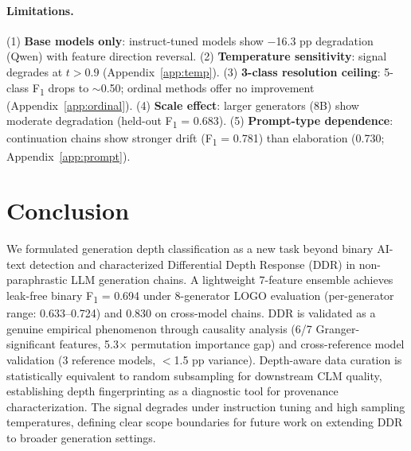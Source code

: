 \documentclass[11pt,a4paper]{article}
\newcommand{\fone}{F\textsubscript{1}}
\begin{document}
\paragraph{Limitations.}
(1) \textbf{Base models only}: instruct-tuned models show $-$16.3 pp degradation (Qwen) with feature direction reversal.
(2) \textbf{Temperature sensitivity}: signal degrades at $t > 0.9$ (Appendix~\ref{app:temp}).
(3) \textbf{3-class resolution ceiling}: 5-class \fone{} drops to $\sim$0.50; ordinal methods offer no improvement (Appendix~\ref{app:ordinal}).
(4) \textbf{Scale effect}: larger generators (8B) show moderate degradation (held-out \fone{} = 0.683).
(5) \textbf{Prompt-type dependence}: continuation chains show stronger drift (\fone{} = 0.781) than elaboration (0.730; Appendix~\ref{app:prompt}).

\section{Conclusion}
\label{sec:conclusion}

We formulated generation depth classification as a new task beyond binary AI-text detection
and characterized Differential Depth Response (DDR) in non-paraphrastic LLM generation chains.
A lightweight 7-feature ensemble achieves leak-free binary \fone{} = 0.694 under 8-generator LOGO evaluation
(per-generator range: 0.633--0.724) and 0.830 on cross-model chains.
DDR is validated as a genuine empirical phenomenon through causality analysis (6/7 Granger-significant features, 5.3$\times$ permutation importance gap)
and cross-reference model validation (3 reference models, $<$1.5 pp variance).
Depth-aware data curation is statistically equivalent to random subsampling for downstream CLM quality,
establishing depth fingerprinting as a diagnostic tool for provenance characterization.
The signal degrades under instruction tuning and high sampling temperatures,
defining clear scope boundaries for future work on extending DDR to broader generation settings.


\end{document}
